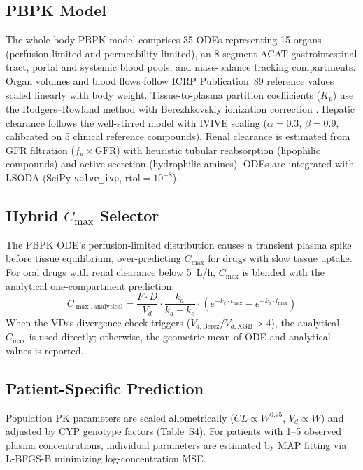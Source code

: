 \documentclass[review,3p]{elsarticle}
\begin{document}
\subsection{PBPK Model}
\label{sec:pbpk}

The whole-body PBPK model comprises 35 ODEs representing 15 organs (perfusion-limited and permeability-limited), an 8-segment ACAT gastrointestinal tract, portal and systemic blood pools, and mass-balance tracking compartments. Organ volumes and blood flows follow ICRP Publication~89 reference values scaled linearly with body weight. Tissue-to-plasma partition coefficients ($K_p$) use the Rodgers--Rowland method \cite{rodgers2006tissue} with Berezhkovskiy ionization correction \cite{berezhkovskiy2004vd}. Hepatic clearance follows the well-stirred model with IVIVE scaling ($\alpha=0.3$, $\beta=0.9$, calibrated on 5 clinical reference compounds). Renal clearance is estimated from GFR filtration ($f_u \times \text{GFR}$) with heuristic tubular reabsorption (lipophilic compounds) and active secretion (hydrophilic amines). ODEs are integrated with LSODA (SciPy \texttt{solve\_ivp}, $\text{rtol}=10^{-8}$).

\subsection{Hybrid $C_{\max}$ Selector}
\label{sec:hybrid-cmax}

The PBPK ODE's perfusion-limited distribution causes a transient plasma spike before tissue equilibrium, over-predicting $C_{\max}$ for drugs with slow tissue uptake. For oral drugs with renal clearance below \SI{5}{L/h}, $C_{\max}$ is blended with the analytical one-compartment prediction:
\begin{equation}
C_{\max,\text{analytical}} = \frac{F \cdot D}{V_d} \cdot \frac{k_a}{k_a - k_e} \cdot \left(e^{-k_e \cdot t_{\max}} - e^{-k_a \cdot t_{\max}}\right)
\label{eq:cmax-analytical}
\end{equation}
When the VDss divergence check triggers ($V_{d,\text{Berez}} / V_{d,\text{XGB}} > 4$), the analytical $C_{\max}$ is used directly; otherwise, the geometric mean of ODE and analytical values is reported.

\subsection{Patient-Specific Prediction}
\label{sec:patient}

Population PK parameters are scaled allometrically ($CL \propto W^{0.75}$, $V_d \propto W$) and adjusted by CYP genotype factors (Table~S4). For patients with 1--5 observed plasma concentrations, individual parameters are estimated by MAP fitting via L-BFGS-B minimizing log-concentration MSE.
\end{document}
